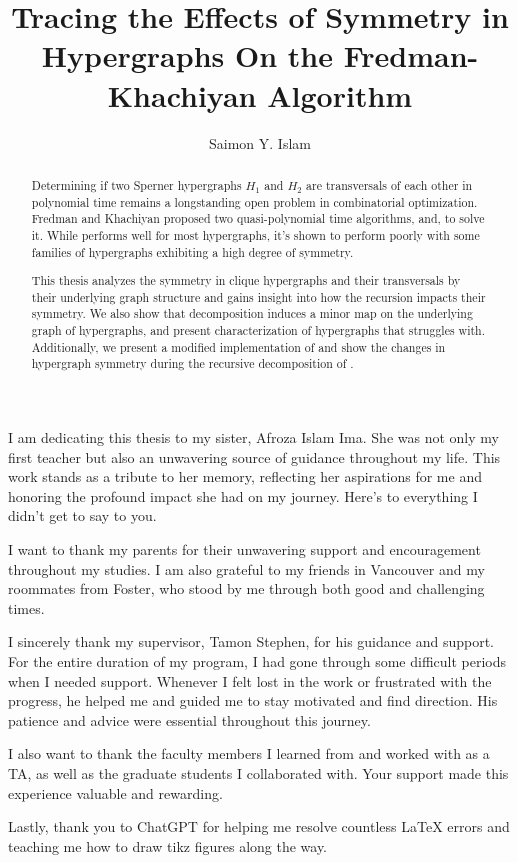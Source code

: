 \documentclass{sfuthesis}
\title{Tracing the Effects of Symmetry in Hypergraphs On the Fredman-Khachiyan Algorithm}
\author{Saimon Y. Islam}
\begin{document}
\frontmatter
\maketitle{}
\makecommittee{}

\begin{abstract}
Determining if two Sperner hypergraphs $H_1$ and $H_2$ are transversals of each other in polynomial time remains a longstanding open problem in combinatorial optimization. Fredman and Khachiyan proposed two quasi-polynomial time algorithms, \FKA{} and\FKB, to solve it. While \FKA{} performs well for most hypergraphs, it's shown to perform poorly with some families of hypergraphs exhibiting a high degree of symmetry.

This thesis analyzes the symmetry in clique hypergraphs and their transversals by their underlying graph structure and gains insight into how the \FKA{} recursion impacts their symmetry. We also show that \FKA{} decomposition induces a minor map on the underlying graph of hypergraphs, and present characterization of hypergraphs that \FKA{} struggles with. Additionally, we present a modified implementation of \FKA{} and show the changes in hypergraph symmetry during the recursive decomposition of \FKA.
\end{abstract}

\begin{dedication}
I am dedicating this thesis to my sister, Afroza Islam Ima. She was not only my first teacher but also an unwavering source of guidance throughout my life. This work stands as a tribute to her memory, reflecting her aspirations for me and honoring the profound impact she had on my journey. Here's to everything I didn't get to say to you.
\end{dedication}

\begin{acknowledgements}
I want to thank my parents for their unwavering support and encouragement throughout my studies. I am also grateful to my friends in Vancouver and my roommates from Foster, who stood by me through both good and challenging times.

I sincerely thank my supervisor, Tamon Stephen, for his guidance and support. For the entire duration of my program, I had gone through some difficult periods when I needed support. Whenever I felt lost in the work or frustrated with the progress, he helped me and guided me to stay motivated and find direction. His patience and advice were essential throughout this journey.

I also want to thank the faculty members I learned from and worked with as a TA, as well as the graduate students I collaborated with. Your support made this experience valuable and rewarding.

Lastly, thank you to ChatGPT for helping me resolve countless \LaTeX{} errors and teaching me how to draw tikz figures along the way.
\end{acknowledgements}
\end{document}
